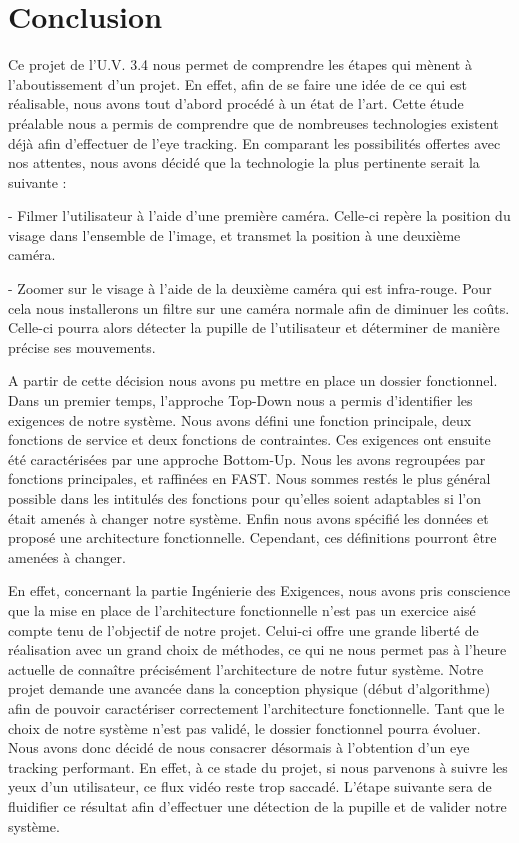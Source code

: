 \chapter{Conclusion}


Ce projet de l'U.V. 3.4 nous permet de comprendre les étapes qui mènent à l'aboutissement d'un projet. En effet, afin de se faire une idée de ce qui est réalisable, nous avons tout d'abord procédé à un état de l'art. Cette étude préalable nous a permis de comprendre que de nombreuses technologies existent déjà afin d'effectuer de l'eye tracking. En comparant les possibilités offertes avec nos attentes, nous avons décidé que la technologie la plus pertinente serait la suivante :

- Filmer l'utilisateur à l'aide d'une première caméra. Celle-ci repère la position du visage dans l'ensemble de l'image, et transmet la position à une deuxième caméra.

- Zoomer sur le visage à l'aide de la deuxième caméra qui est infra-rouge. Pour cela nous installerons  un filtre sur une caméra normale afin de diminuer les coûts. Celle-ci pourra alors détecter la pupille de l'utilisateur et déterminer de manière précise ses mouvements.

\vspace*{1cm}

A partir de cette décision nous avons pu mettre en place un dossier fonctionnel. Dans un premier temps, l'approche Top-Down nous a permis d'identifier les exigences de notre système. Nous avons défini une fonction  principale, deux fonctions de service et deux fonctions de contraintes. Ces exigences ont ensuite été caractérisées par une approche Bottom-Up. Nous les avons regroupées par fonctions principales, et raffinées en FAST. Nous sommes restés le plus général possible dans les intitulés des fonctions pour qu'elles soient adaptables si l'on était amenés à changer notre système. Enfin nous avons spécifié les données et proposé une architecture fonctionnelle. Cependant, ces définitions pourront être amenées à changer.

\vspace*{1cm}

En effet, concernant la partie Ingénierie des Exigences, nous avons pris conscience que la mise en place de l'architecture fonctionnelle n'est pas un exercice aisé compte tenu de l'objectif de notre projet. Celui-ci offre une grande liberté de réalisation avec un grand choix de méthodes, ce qui ne nous permet pas à l'heure actuelle de connaître précisément l'architecture de notre futur système. Notre projet demande une avancée dans la conception physique (début d'algorithme) afin de pouvoir caractériser correctement l'architecture fonctionnelle. Tant que le choix de notre système n'est pas validé, le dossier fonctionnel pourra évoluer. Nous avons donc décidé de nous consacrer désormais à l'obtention d'un eye tracking performant. En effet, à ce stade du projet, si nous parvenons à suivre les yeux d'un utilisateur, ce flux vidéo reste trop saccadé. L'étape suivante sera de fluidifier ce résultat afin d'effectuer une détection de la pupille et de valider notre système.

